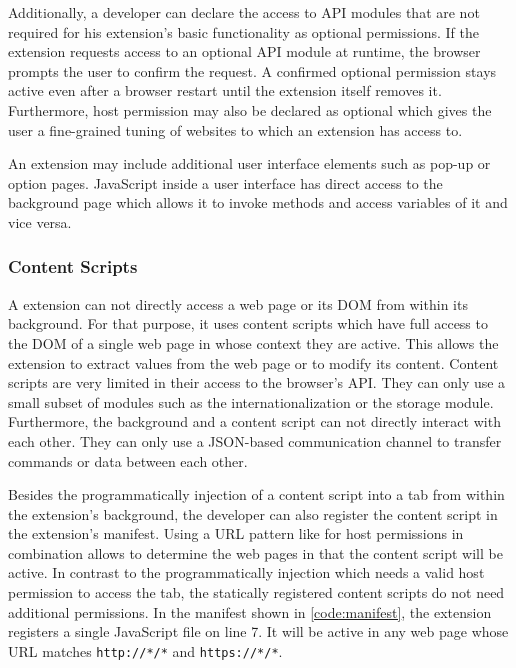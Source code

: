 	Additionally, a developer can declare the access to API modules that are not required for his extension's basic functionality as optional permissions. If the extension requests access to an optional API module at runtime, the browser prompts the user to confirm the request. A confirmed optional permission stays active even after a browser restart until the extension itself removes it. Furthermore, host permission may also be declared as optional which gives the user a fine-grained tuning of websites to which an extension has access to. 
	
	An extension may include additional user interface elements such as pop-up or option pages. JavaScript inside a user interface has direct access to the background page which allows it to invoke methods and access variables of it and vice versa. 
	
\subsubsection{Content Scripts}
	
	A extension can not directly access a web page or its DOM from within its background. For that purpose, it uses content scripts which have full access to the DOM of a single web page in whose context they are active. This allows the extension to extract values from the web page or to modify its content. Content scripts are very limited in their access to the browser's API. They can only use a small subset of modules such as the internationalization or the storage module. Furthermore, the background and a content script can not directly interact with each other. They can only use a JSON-based communication channel to transfer commands or data between each other. 
	
	Besides the programmatically injection of a content script into a tab from within the extension's background, the developer can also register the content script in the extension's manifest. Using a URL pattern like for host permissions in combination allows to determine the web pages in that the content script will be active. In contrast to the programmatically injection which needs a valid host permission to access the tab, the statically registered content scripts do not need additional permissions. In the manifest shown in \autoref{code:manifest}, the extension registers a single JavaScript file on line 7. It will be active in any web page whose URL matches \texttt{http://*/*} and \texttt{https://*/*}.
	
